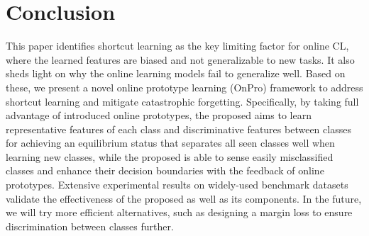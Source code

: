 \section{Conclusion}

This paper identifies shortcut learning as the key limiting factor for online CL, where the learned features are biased and not generalizable to new tasks. It also sheds light on why the online learning models fail to generalize well.
Based on these,
we present a novel online prototype learning (OnPro) framework to address shortcut learning and mitigate catastrophic forgetting.
Specifically,
by taking full advantage of introduced online prototypes,
the proposed \methodname aims to learn representative features of each class and discriminative features between classes for achieving an equilibrium status that separates all seen classes well when learning new classes, 
while the proposed \dataaugname is able to sense easily misclassified classes and enhance their decision boundaries with the feedback of online prototypes.
Extensive experimental results on widely-used benchmark datasets validate the effectiveness of the proposed \frameworkName as well as its components.
In the future, we will try more efficient alternatives, such as designing a margin loss to ensure discrimination between classes further.